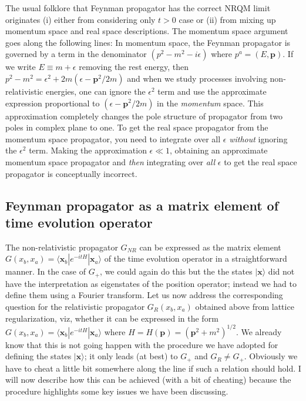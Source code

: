 \documentclass{article}
\def\ket#1{|#1\rangle}                    %
\def\bk#1#2#3{{\langle #1|#2|#3\rangle}}  %
\begin{document}
 The usual folklore that Feynman propagator has the correct NRQM limit originates (i) either from considering only $t>0$ case or (ii) from mixing up momentum space and real space descriptions. The momentum space argument goes along the following lines: In momentum space, the Feynman propagator is governed by a term in the denominator $(p^2-m^2-i\epsilon)$ where $p^a=(E,\bm p)$. If we write $E\equiv m+\epsilon$ removing the rest energy, then $p^2-m^2=\epsilon^2+2m(\epsilon-\bm{p}^2/2m)$ and when we study processes involving non-relativistic energies, one can ignore the $\epsilon^2$ term and use the approximate  expression proportional to $(\epsilon-\bm{p}^2/2m)$  in the \textit{momentum} space. This approximation completely changes the pole structure of propagator from two poles in complex plane to one. To get the real space propagator from the momentum space propagator, you need to integrate over all $\epsilon$ \textit{without} ignoring the $\epsilon^2$ term. Making the approximation $\epsilon\ll1$, obtaining an approximate momentum space propagator and \textit{then} integrating over \textit{all} $\epsilon$ to get the real space propagator is conceptually incorrect. 
  
  \subsection{Feynman propagator as a matrix element of time evolution operator}\label{sec:fmatrix} 
  
 The non-relativistic propagator $G_{NR}$ can be expressed as the matrix element  $G(x_b , x_a) = \bk{\bm{x}_b}{e^{-itH}}{\bm{x}_a}$ of the 
  time evolution operator in a straightforward manner. In the case of $G_{+}$, we could again do this but the the states $\ket{\bm{x}}$ did not have the interpretation as eigenstates of the position operator; instead we had to define them using a Fourier transform. 
  Let us now address the corresponding question for the relativistic propagator $G_R(x_b,x_a)$ obtained above from lattice regularization, viz, whether it can  be expressed in the form $G(x_b , x_a) = \bk{\bm{x}_b}{e^{-itH}}{\bm{x}_a}$ where $H=H(\bm{p}) =({\bm p}^2+m^2)^{1/2}$.  We already know that this is not going happen  with the  procedure we have adopted for defining the states $\ket{\bm x}$; it only leads (at best) to $G_{+}$ and $G_R\neq G_{+}$. Obviously we have to cheat a little bit 
  somewhere along the line if such a relation should hold. I will now describe how this can be achieved (with a bit of cheating) because the procedure highlights some key issues we have been discussing. 
  
\end{document}
